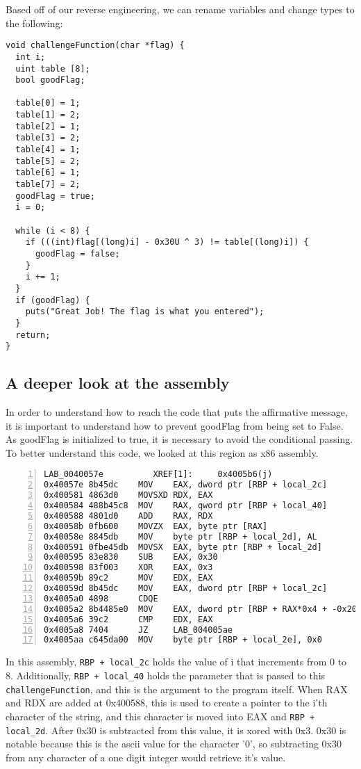 Based off of our reverse engineering, we can rename variables and change types to the following:
\begin{lstlisting}
void challengeFunction(char *flag) {
  int i;
  uint table [8];
  bool goodFlag;
  
  table[0] = 1;
  table[1] = 2;
  table[2] = 1;
  table[3] = 2;
  table[4] = 1;
  table[5] = 2;
  table[6] = 1;
  table[7] = 2;
  goodFlag = true;
  i = 0;

  while (i < 8) {
    if (((int)flag[(long)i] - 0x30U ^ 3) != table[(long)i]) {
      goodFlag = false;
    }
    i += 1;
  }
  if (goodFlag) {
    puts("Great Job! The flag is what you entered");
  }
  return;
}
\end{lstlisting}

\subsection{A deeper look at the assembly}
In order to understand how to reach the code that puts the affirmative message, it is important to understand how to prevent goodFlag from being set to False. As goodFlag is initialized to true, it is necessary to avoid the conditional passing. To better understand this code, we looked at this region as x86 assembly.

\begin{lstlisting}[numbers=left]
LAB_0040057e          XREF[1]:     0x4005b6(j)  
0x40057e 8b45dc    MOV    EAX, dword ptr [RBP + local_2c]
0x400581 4863d0    MOVSXD RDX, EAX
0x400584 488b45c8  MOV    RAX, qword ptr [RBP + local_40]
0x400588 4801d0    ADD    RAX, RDX
0x40058b 0fb600    MOVZX  EAX, byte ptr [RAX]
0x40058e 8845db    MOV    byte ptr [RBP + local_2d], AL
0x400591 0fbe45db  MOVSX  EAX, byte ptr [RBP + local_2d]
0x400595 83e830    SUB    EAX, 0x30
0x400598 83f003    XOR    EAX, 0x3
0x40059b 89c2      MOV    EDX, EAX
0x40059d 8b45dc    MOV    EAX, dword ptr [RBP + local_2c]
0x4005a0 4898      CDQE
0x4005a2 8b4485e0  MOV    EAX, dword ptr [RBP + RAX*0x4 + -0x20]
0x4005a6 39c2      CMP    EDX, EAX
0x4005a8 7404      JZ     LAB_004005ae
0x4005aa c645da00  MOV    byte ptr [RBP + local_2e], 0x0
\end{lstlisting}

In this assembly, \texttt{RBP + local\_2c} holds the value of i that increments from 0 to 8. Additionally, \texttt{RBP + local\_40} holds the parameter that is passed to this \texttt{challengeFunction}, and this is the argument to the program itself. When RAX and RDX are added at 0x400588, this is used to create a pointer to the i'th character of the string, and this character is moved into EAX and \texttt{RBP + local\_2d}. After 0x30 is subtracted from this value, it is xored with 0x3. 0x30 is notable because this is the ascii value for the character '0', so subtracting 0x30 from any character of a one digit integer would retrieve it's value. 

